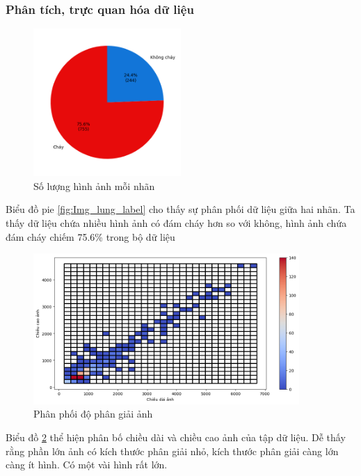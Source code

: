 \subsubsection{Phân tích, trực quan hóa dữ liệu}

    \begin{figure}[htp]
        \centering
        \includegraphics[width=0.50\textwidth]{images/Img_fire_label.png}
        \caption{Số lượng hình ảnh mỗi nhãn}
        \label{fig:Img_fire_label}
    \end{figure}
    \FloatBarrier

    Biểu đồ pie \ref{fig:Img_lung_label} cho thấy sự phân phối dữ liệu giữa hai nhãn. Ta thấy dữ liệu chứa nhiều hình ảnh có đám cháy hơn so với không, hình ảnh chứa đám cháy chiếm 75.6\% trong bộ dữ liệu

    \begin{figure}[htp]
        \centering
        \includegraphics[width=0.90\textwidth]{images/Img_fire_resolution.png}
        \caption{Phân phối độ phân giải ảnh}
        \label{fig:Img_fire_resolution}
    \end{figure}
    \FloatBarrier

    Biểu đồ \ref{fig:Img_fire_resolution} thể hiện phân bố chiều dài và chiều cao ảnh của tập dữ liệu. Dễ thấy rằng phần lớn ảnh có kích thước phân giải nhỏ, kích thước phân giải càng lớn càng ít hình. Có một vài hình rất lớn.


